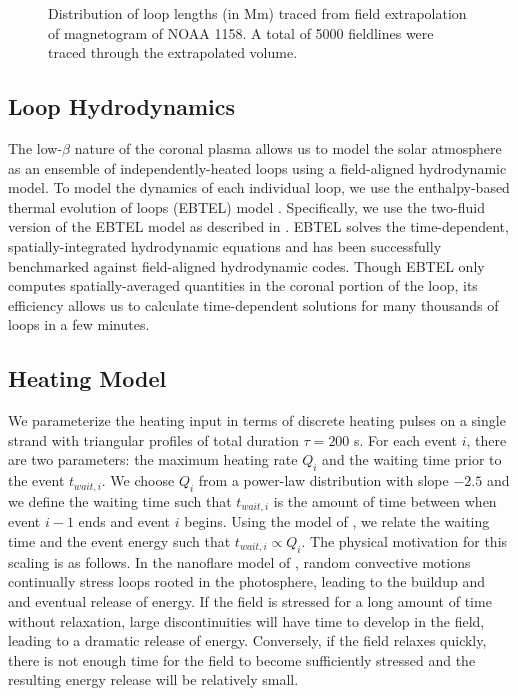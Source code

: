 \begin{figure}
    \caption{Distribution of loop lengths (in Mm) traced from field extrapolation of magnetogram of NOAA 1158. A total of 5000 fieldlines were traced through the extrapolated volume.}
    \label{fig:loops}
\end{figure}

\subsection{Loop Hydrodynamics}\label{loops}

The low-$\beta$ nature of the coronal plasma allows us to model the solar atmosphere as an ensemble of independently-heated loops using a field-aligned hydrodynamic model. To model the dynamics of each individual loop, we use the enthalpy-based thermal evolution of loops (EBTEL) model \citep{klimchuk_highly_2008,cargill_enthalpy-based_2012}. Specifically, we use the two-fluid version of the EBTEL model as described in \citep{barnes_inference_2016}. EBTEL solves the time-dependent, spatially-integrated hydrodynamic equations and has been successfully benchmarked against field-aligned hydrodynamic codes. Though EBTEL only computes spatially-averaged quantities in the coronal portion of the loop, its efficiency allows us to calculate time-dependent solutions for many thousands of loops in a few minutes.

\subsection{Heating Model}\label{heating}

We parameterize the heating input in terms of discrete heating pulses on a single strand with triangular profiles of total duration $\tau=200$ s. For each event $i$, there are two parameters: the maximum heating rate $Q_i$ and the waiting time prior to the event $t_{wait,i}$. We choose $Q_i$ from a power-law distribution with slope $-2.5$ and we define the waiting time such that $t_{wait,i}$ is the amount of time between when event $i-1$ ends and event $i$ begins. Using the model of \citet{cargill_active_2014}, we relate the waiting time and the event energy such that $t_{wait,i}\propto Q_i$. The physical motivation for this scaling is as follows. In the nanoflare model of \citet{parker_nanoflares_1988}, random convective motions continually stress loops rooted in the photosphere, leading to the buildup and and eventual release of energy. If the field is stressed for a long amount of time without relaxation, large discontinuities will have time to develop in the field, leading to a dramatic release of energy. Conversely, if the field relaxes quickly, there is not enough time for the field to become sufficiently stressed and the resulting energy release will be relatively small. 

